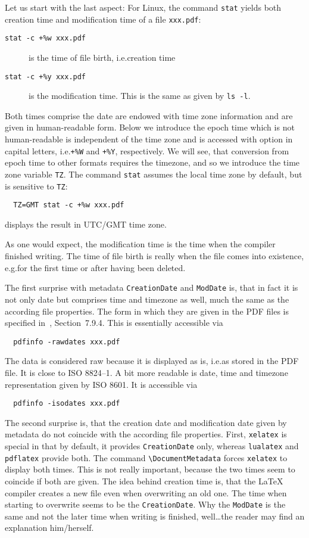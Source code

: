 \documentclass[a4paper, english]{article}%
\newcommand{\pdflatex}{\texttt{pdflatex}}
\newcommand{\lualatex}{\texttt{lualatex}}
\newcommand{\xelatex}{\texttt{xelatex}}
\newcommand{\cmd}[1]{\texttt{\textbackslash#1}}
\begin{document}
Let us start with the last aspect: 
For Linux, the command \texttt{stat} 
yields both creation time and modification time of a file \texttt{xxx.pdf}: 
%
\begin{description}
  \item[\texttt{stat -c +\%w xxx.pdf}] is the time of file birth, i.e.\@ creation time 
  \item[\texttt{stat -c +\%y xxx.pdf}] is the modification time. 
  This is the same as given by \texttt{ls -l}. 
\end{description}
%
Both times comprise the date 
are endowed with time zone information and are given in human-readable form. 
Below we introduce the epoch time which is not human-readable is independent of the time zone 
and is accessed with option in capital letters, 
i.e.\@ \texttt{+\%W} and \texttt{+\%Y}, respectively. 
We will see, that conversion from epoch time to other formats requires the timezone, 
and so we introduce the time zone variable \texttt{TZ}. 
The command \texttt{stat} assumes the local time zone by default, 
but is sensitive to \texttt{TZ}: 
%
\begin{verbatim}
  TZ=GMT stat -c +%w xxx.pdf
\end{verbatim}
%
displays the result in UTC/GMT time zone. 


As one would expect, the modification time is the time when the compiler finished writing. 
The time of file birth is really when the file comes into existence, 
e.g.\@ for the first time or after having been deleted. 

The first surprise with metadata \texttt{CreationDate} and \texttt{ModDate} is, 
that in fact it is not only date but comprises time and timezone as well, 
much the same as the according file properties. 
The form in which they are given in the PDF files 
is specified in~\cite{Pdf20}, Section~7.9.4. 
This is essentially accessible via 
%
\begin{verbatim}
  pdfinfo -rawdates xxx.pdf
\end{verbatim}
%
The data is considered raw because it is displayed as is, 
i.e.\@ as stored in the PDF file. 
It is close to ISO 8824--1. 
A bit more readable is date, time and timezone representation given by ISO 8601. 
It is accessible via 
%
\begin{verbatim}
  pdfinfo -isodates xxx.pdf
\end{verbatim}

The second surprise is, that the creation date and modification date given by metadata 
do not coincide with the according file properties. 
First, \xelatex{} is special in that by default, it provides \texttt{CreationDate} only, 
whereas \lualatex{} and \pdflatex{} provide both. 
The command \cmd{DocumentMetadata} forces \xelatex{} to display both times. 
This is not really important, because the two times seem to coincide if both are given. 
The idea behind creation time is, that the \LaTeX{} compiler creates a new file 
even when overwriting an old one. 
The time when starting to overwrite seems to be the \texttt{CreationDate}. 
Why the \texttt{ModDate} is the same and not the later time when writing is finished, 
well\dots the reader may find an explanation him/herself. 
\end{document}
